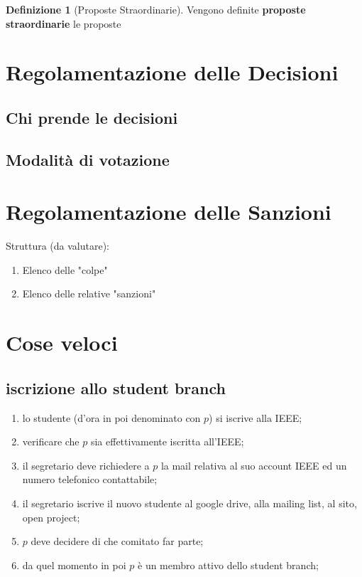 \documentclass[pdf]{article}
\theoremstyle{definition}
\newtheorem{defn}{Definizione}[section]
\begin{document}
\begin{defn}[Proposte Straordinarie]
	Vengono definite \textbf{proposte straordinarie} le proposte
\end{defn}


\section{Regolamentazione delle Decisioni}

\subsection{Chi prende le decisioni}

\subsection{Modalità di votazione}

\section{Regolamentazione delle Sanzioni}

Struttura (da valutare):
\begin{enumerate}
	\item Elenco delle "colpe"
	\item Elenco delle relative "sanzioni"
\end{enumerate}

\section{Cose veloci}

\subsection{iscrizione allo student branch}

\begin{enumerate}
	\item lo studente (d'ora in poi denominato con $p$) si iscrive alla IEEE;
	\item verificare che $p$ sia effettivamente iscritta all’IEEE;
	\item il segretario deve richiedere a $p$ la mail relativa al suo account IEEE ed un numero telefonico contattabile;
	\item il segretario iscrive il nuovo studente al google drive, alla mailing list, al sito, open project;
	\item $p$ deve decidere di che comitato far parte;
	\item da quel momento in poi $p$ è un membro attivo dello student branch;
\end{enumerate}
\end{document}
